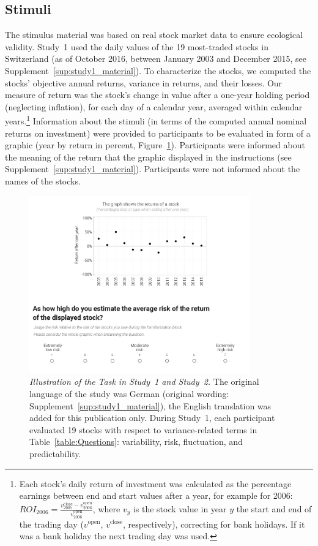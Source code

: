 \documentclass[a4paper,man, natbib,floatsintext]{apa6} %
\begin{document}
\subsection{Stimuli}
The stimulus material was based on real stock market data to ensure ecological validity. Study~1 used the daily values of the 19 most-traded stocks in Switzerland (as of October 2016, between January 2003 and December 2015, see Supplement~\ref{sup:study1_material}). To characterize the stocks, we computed the stocks' objective annual returns, variance in returns, and their losses. Our  measure of return was the stock's change in value after a one-year holding period (neglecting inflation), for each day of a calendar year, averaged within calendar years.\footnote{Each stock's daily return of investment was calculated as the percentage earnings between end and start values after a year, for example for 2006: $ROI_{2006} = \frac{v_{2007}^{\text{close}} - v_{2006}^{\text{open}}}{v_{2006}^{\text{open}}}$, where $v_y$ is the stock value in year $y$ the start and end of the trading day ($v^{\text{open}}$, $v^{\text{close}}$, respectively), correcting for bank holidays. If it was a bank holiday the next trading day was used.}
Information about the stimuli (in terms of the computed annual nominal returns on investment) were provided to participants to be evaluated in form of a graphic (year by return in percent, Figure~\ref{fig:study1_material}). Participants were informed about the meaning of the return that the graphic displayed in the instructions (see Supplement~\ref{sup:study1_material}). Participants were not informed about the names of the stocks.

\begin{figure}[h!] \centering
    \includegraphics[width=0.85\textwidth]{fig1}
    \caption{\textit{Illustration of the Task in Study~1 and Study~2.} The original language of the study was German  (original wording: Supplement~\ref{sup:study1_material}), the English translation was added for this publication only. During Study~1, each participant evaluated 19 stocks with respect to variance-related terms in Table~\ref{table:Questions}: variability, risk, fluctuation, and predictability.}
    \label{fig:study1_material}
\end{figure}
\end{document}
